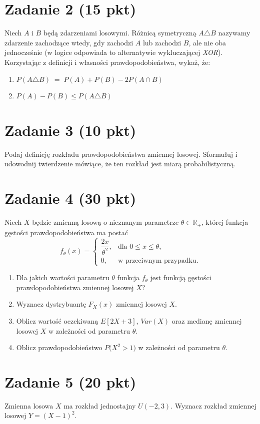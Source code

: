 \documentclass[polish, 10pt]{extarticle}
\begin{document}
\section*{Zadanie 2 (15 pkt)}
Niech \(A\) i \(B\) będą zdarzeniami losowymi.
Różnicą symetryczną \(A \triangle B\) nazywamy zdarzenie zachodzące wtedy, gdy zachodzi \(A\) lub zachodzi \(B\), ale nie oba jednocześnie (w logice odpowiada to alternatywie wykluczającej \emph{XOR}). Korzystając z definicji i własności prawdopodobieństwa, wykaż, że:
\begin{enumerate}
\item $P(A \triangle B) \;=\; P(A) + P(B) - 2P(A \cap B)$
\item $P(A) - P(B) \leq P(A \triangle B)$
\end{enumerate}

\section*{Zadanie 3 (10 pkt)}
Podaj definicję rozkładu prawdopodobieństwa zmiennej losowej. Sformułuj i udowodnij twierdzenie mówiące, że ten rozkład jest miarą probabilistyczną.

\section*{Zadanie 4 (30 pkt)}

Niech $X$ będzie zmienną losową o nieznanym parametrze $\theta \in \mathbb{R}_+$, której funkcja
gęstości prawdopodobieństwa ma postać
\[
f_\theta(x) =
\begin{cases}
\dfrac{2x}{\theta^2}, & \text{dla } 0 \leq x \leq \theta,\\[4pt]
0, & \text{w przeciwnym przypadku.}
\end{cases}
\]

\begin{enumerate}[label=\alph*)]
    \item Dla jakich wartości parametru $\theta$ funkcja $f_\theta$ jest
    funkcją gęstości prawdopodobieństwa zmiennej losowej $X$?

    \item Wyznacz dystrybuantę $F_X(x)$ zmiennej losowej $X$.

    \item Oblicz wartość oczekiwaną $E[2X+3]$, $Var(X)$ oraz medianę
    zmiennej losowej $X$ w zależności od parametru $\theta$.

    \item Oblicz prawdopodobieństwo $P\bigl(X^2 > 1\bigr)$ w zależności od parametru $\theta$.
\end{enumerate}

\section*{Zadanie 5 (20 pkt)}
Zmienna losowa \(X\) ma rozkład jednostajny \(U(-2, 3)\).
Wyznacz rozkład zmiennej losowej \(Y = (X-1)^2\).
\end{document}
